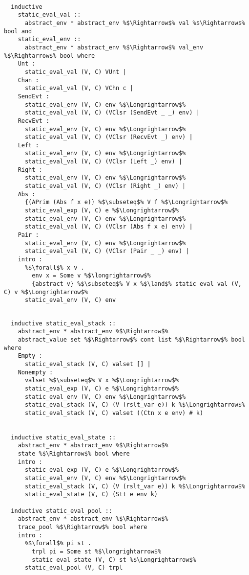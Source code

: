 \documentclass{article}
\begin{document}
\begin{lstlisting}[style=codestyle1, escapechar=\%]

  inductive 
    static_eval_val ::
      abstract_env * abstract_env %$\Rightarrow$% val %$\Rightarrow$% bool and  
    static_eval_env ::
      abstract_env * abstract_env %$\Rightarrow$% val_env %$\Rightarrow$% bool where
    Unt :
      static_eval_val (V, C) VUnt |
    Chan :
      static_eval_val (V, C) VChn c |
    SendEvt :
      static_eval_env (V, C) env %$\Longrightarrow$%
      static_eval_val (V, C) (VClsr (SendEvt _ _) env) |
    RecvEvt :
      static_eval_env (V, C) env %$\Longrightarrow$%
      static_eval_val (V, C) (VClsr (RecvEvt _) env) |
    Left :
      static_eval_env (V, C) env %$\Longrightarrow$%
      static_eval_val (V, C) (VClsr (Left _) env) |
    Right :
      static_eval_env (V, C) env %$\Longrightarrow$%
      static_eval_val (V, C) (VClsr (Right _) env) |
    Abs :
      {(APrim (Abs f x e)} %$\subseteq$% V f %$\Longrightarrow$% 
      static_eval_exp (V, C) e %$\Longrightarrow$% 
      static_eval_env (V, C) env %$\Longrightarrow$%
      static_eval_val (V, C) (VClsr (Abs f x e) env) |
    Pair :
      static_eval_env (V, C) env %$\Longrightarrow$%
      static_eval_val (V, C) (VClsr (Pair _ _) env) |
    intro :  
      %$\forall$% x v .
        env x = Some v %$\longrightarrow$%
        {abstract v} %$\subseteq$% V x %$\land$% static_eval_val (V, C) v %$\Longrightarrow$%
      static_eval_env (V, C) env

  \end{lstlisting}
\begin{lstlisting}[style=codestyle1, escapechar=\%]

  inductive static_eval_stack ::
    abstract_env * abstract_env %$\Rightarrow$%
    abstract_value set %$\Rightarrow$% cont list %$\Rightarrow$% bool where
    Empty :
      static_eval_stack (V, C) valset [] |
    Nonempty : 
      valset %$\subseteq$% V x %$\Longrightarrow$%
      static_eval_exp (V, C) e %$\Longrightarrow$%
      static_eval_env (V, C) env %$\Longrightarrow$%
      static_eval_stack (V, C) (V (rslt_var e)) k %$\Longrightarrow$%
      static_eval_stack (V, C) valset ((Ctn x e env) # k)


  inductive static_eval_state ::
    abstract_env * abstract_env %$\Rightarrow$%
    state %$\Rightarrow$% bool where
    intro :
      static_eval_exp (V, C) e %$\Longrightarrow$%
      static_eval_env (V, C) env %$\Longrightarrow$%
      static_eval_stack (V, C) (V (rslt_var e)) k %$\Longrightarrow$%
      static_eval_state (V, C) (Stt e env k)

  inductive static_eval_pool ::
    abstract_env * abstract_env %$\Rightarrow$%
    trace_pool %$\Rightarrow$% bool where
    intro :
      %$\forall$% pi st .
        trpl pi = Some st %$\longrightarrow$%
        static_eval_state (V, C) st %$\Longrightarrow$% 
      static_eval_pool (V, C) trpl

  \end{lstlisting}
\end{document}

